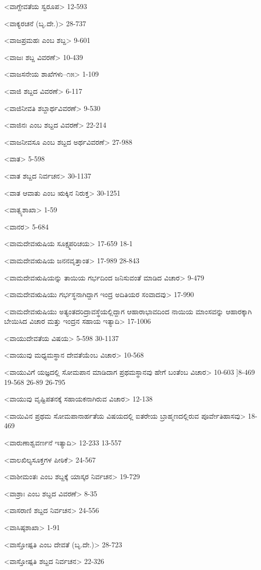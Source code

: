 <ವಾಗ್ದೇವತೆಯ ಸ್ವರೂಪ>
12-593

<ವಾಕ್ಯರಚನೆ (ಬೃ.ದೇ.)>
28-737

<ವಾಜಪ್ರಮಹಃ ಎಂಬ ಶಬ್ದ>
9-601

<ವಾಜಃ ಶಬ್ದ ವಿವರಣೆ>
10-439

<ವಾಜಸನೇಯ ಶಾಖೆಗಳು–೧೫>
1-109

<ವಾಜಿ ಶಬ್ದದ ವಿವರಣೆ>
6-117

<ವಾಜಿನೀವತಿ ಶಬ್ದಾರ್ಥವಿವರಣೆ>
9-530

<ವಾಜಿನಃ ಎಂಬ ಶಬ್ದದ ವಿವರಣೆ>
22-214

<ವಾಜನೀವಸೂ ಎಂಬ ಶಬ್ದದ ಅರ್ಥವಿವರಣೆ>
27-988

<ವಾತ>
5-598

<ವಾತ ಶಬ್ದದ ನಿರ್ವಚನ>
30-1137

<ವಾತ ಆವಾತು ಎಂಬ ಋಕ್ಕಿನ ನಿರುಕ್ತ>
30-1251

<ವಾತ್ಸ್ಯಶಾಖಾ>
1-59

<ವಾನರ>
5-684

<ವಾಮದೇವಋಷಿಯ ಸೂಕ್ಷ್ಮಪರಿಚಯ>
17-659
18-1

<ವಾಮದೇವಋಷಿಯ ಜನನವೃತ್ತಾಂತ>
17-989
28-843

<ವಾಮದೇವಋಷಿಯನ್ನು ತಾಯಿಯ ಗರ್ಭದಿಂದ ಜನಿಸುವಂತೆ ಮಾಡಿದ ವಿಚಾರ>
9-479

<ವಾಮದೇವಋಷಿಯು ಗರ್ಭಸ್ಥನಾಗಿದ್ದಾಗ ಇಂದ್ರ ಅದಿತಿಯರ ಸಂವಾದವು>
17-990

<ವಾಮದೇವಋಷಿಯು ಅತ್ಯಂತದರಿದ್ರಾವಸ್ಥೆಯಲ್ಲಿದ್ದಾಗ ಆಹಾರಾಭಾವದಿಂದ ನಾಯಿಯ ಮಾಂಸವನ್ನು ಆಹಾರಕ್ಕಾಗಿ ಬೇಯಿಸಿದ ವಿಚಾರ ಮತ್ತು ಇಂದ್ರನ ಸಹಾಯ ಇತ್ಯಾದಿ>
17-1006

<ವಾಯುದೇವತೆಯ ವಿಷಯ>
5-598
30-1137


<ವಾಯುವು ಮಧ್ಯಮಸ್ಥಾನ ದೇವತೆಯೆಂಬ ವಿಚಾರ>
10-568

<ವಾಯುವಿಗೆ ಯಜ್ಞದಲ್ಲಿ ಸೋಮಪಾನ ಮಾಡಿದಾಗ ಪ್ರಥಮಸ್ಥಾನವು ಹೇಗೆ ಬಂತೆಂಬ ವಿಚಾರ>
10-603
]8-469
19-568 
26-89
26-795

<ವಾಯುವು ವೃಷ್ಟಿಪತನಕ್ಕೆ ಸಹಾಯಕನಾಗಿರುವ ವಿಚಾರ>
12-138


<ವಾಯಿವಿನ ಪ್ರಥಮ ಸೋಮಪಾನಾರ್ಹತೆಯ ವಿಷಯದಲ್ಲಿ ಐತರೇಯ ಬ್ರಾಹ್ಮಣದಲ್ಲಿರುವ ಪೂರ್ವೇತಿಹಾಸವು>
18-469

<ವಾರುಣಾಶ್ವವರ್ಣನೆ ಇತ್ಯಾದಿ>
12-233
13-557

<ವಾಲಖಿಲ್ಯಸೂಕ್ತಗಳ ಪೀಠಿಕೆ>
24-567

<ವಾಶೀಮಂತಃ ಎಂಬ ಶಬ್ದಕ್ಕೆ ಯಾಸ್ಕರ ನಿರ್ವಚನ>
19-729

<ವಾಶ್ರಾಃ ಎಂಬ ಶಬ್ದದ ವಿವರಣೆ>
8-35

<ವಾಸರಾಣಿ ಶಬ್ದದ ನಿರ್ವಚನ>
24-556

<ವಾಸಿಷ್ಠಶಾಖಾ>
1-91

<ವಾಸ್ತೋಷ್ಪತಿ ಎಂಬ ದೇವತೆ (ಬೃ.ದೇ.)>
28-723

<ವಾಸ್ತೋಷ್ಪತಿ ಶಬ್ದದ ನಿರ್ವಚನ>
22-326

